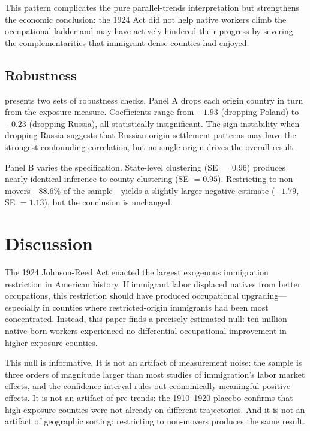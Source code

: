 \documentclass[12pt]{article}
\begin{document}
This pattern complicates the pure parallel-trends interpretation but strengthens the economic conclusion: the 1924 Act did not help native workers climb the occupational ladder and may have actively hindered their progress by severing the complementarities that immigrant-dense counties had enjoyed.

\subsection{Robustness}



 presents two sets of robustness checks.  Panel A drops each origin country in turn from the exposure measure.  Coefficients range from $-1.93$ (dropping Poland) to $+0.23$ (dropping Russia), all statistically insignificant.  The sign instability when dropping Russia suggests that Russian-origin settlement patterns may have the strongest confounding correlation, but no single origin drives the overall result.

Panel B varies the specification.  State-level clustering (SE $= 0.96$) produces nearly identical inference to county clustering (SE $= 0.95$).  Restricting to non-movers---88.6\% of the sample---yields a slightly larger negative estimate ($-1.79$, SE $= 1.13$), but the conclusion is unchanged.

\section{Discussion}
\label{sec:discussion}

The 1924 Johnson-Reed Act enacted the largest exogenous immigration restriction in American history.  If immigrant labor displaced natives from better occupations, this restriction should have produced occupational upgrading---especially in counties where restricted-origin immigrants had been most concentrated.  Instead, this paper finds a precisely estimated null: ten million native-born workers experienced no differential occupational improvement in higher-exposure counties.

This null is informative.  It is not an artifact of measurement noise: the sample is three orders of magnitude larger than most studies of immigration's labor market effects, and the confidence interval rules out economically meaningful positive effects.  It is not an artifact of pre-trends: the 1910--1920 placebo confirms that high-exposure counties were not already on different trajectories.  And it is not an artifact of geographic sorting: restricting to non-movers produces the same result.
\end{document}
